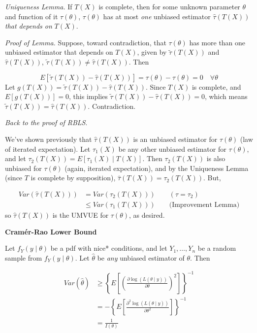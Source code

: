 \documentclass[
  letterpaper,
  DIV=11,
  numbers=noendperiod]{scrreprt}
\begin{document}
\emph{Uniqueness Lemma.} If \(T(X)\) is complete, then for some unknown
parameter \(\theta\) and function of it \(\tau(\theta)\),
\(\tau(\theta)\) has at most \emph{one} unbiased estimator
\(\hat{\tau}(T(X))\) \emph{that depends on} \(T(X)\).

\emph{Proof of Lemma.} Suppose, toward contradiction, that
\(\tau(\theta)\) has more than one unbiased estimator that depends on
\(T(X)\), given by \(\tilde{\tau}(T(X))\) and \(\hat{\tau}(T(X))\),
\(\tilde{\tau}(T(X)) \neq \hat{\tau}(T(X))\). Then

\[
E[\tilde{\tau}(T(X)) - \hat{\tau}(T(X))] = \tau(\theta) - \tau(\theta) = 0 \quad \forall \theta
\] Let \(g(T(X)) = \tilde{\tau}(T(X)) - \hat{\tau}(T(X))\). Since
\(T(X)\) is complete, and \(E[g(T(X))] = 0\), this implies
\(\tilde{\tau}(T(X)) - \hat{\tau}(T(X)) = 0\), which means
\(\tilde{\tau}(T(X)) = \hat{\tau}(T(X))\). Contradiction.

\emph{Back to the proof of RBLS}.

We've shown previously that \(\hat{\tau}(T(X))\) is an unbiased
estimator for \(\tau({\theta})\) (law of iterated expectation). Let
\(\tau_1(X)\) be any other unbiased estimator for \(\tau(\theta)\), and
let \(\tau_2(T(X)) = E[\tau_1(X) \mid T(X)]\). Then \(\tau_2(T(X))\) is
also unbiased for \(\tau(\theta)\) (again, iterated expectation), and by
the Uniqueness Lemma (since \(T\) is complete by supposition),
\(\hat{\tau}(T(X)) = \tau_2(T(X))\). But,

\begin{align*}
    Var(\hat{\tau}(T(X))) & = Var(\tau_2(T(X))) \quad \quad (\hat{\tau} = \tau_2) \\
    & \leq Var(\tau_1(T(X))) \quad \quad \text{(Improvement Lemma)}
\end{align*} so \(\hat{\tau}(T(X))\) is the UMVUE for \(\tau(\theta)\),
as desired.

\textbf{Cramér-Rao Lower Bound}

Let \(f_Y(y \mid \theta)\) be a pdf with nice* conditions, and let
\(Y_1, \dots, Y_n\) be a random sample from \(f_Y(y \mid \theta)\). Let
\(\hat{\theta}\) be \emph{any} unbiased estimator of \(\theta\). Then

\begin{align*} 
Var(\hat{\theta}) & \geq \left\{ E\left[ \left( \frac{\partial \log( L(\theta \mid y))}{\partial \theta}\right)^2\right]\right\}^{-1} \\
& = -\left\{ E\left[ \frac{\partial^2 \log( L(\theta \mid y))}{\partial \theta^2} \right] \right\}^{-1} \\
& = \frac{1}{I(\theta)}
\end{align*}
\end{document}
